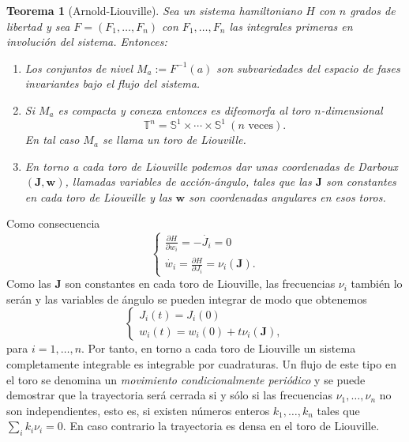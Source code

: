 \documentclass[12pt,a4paper,twoside]{article}
\newtheorem{thm}{Teorema}[section]
\theoremstyle{definition} \newtheorem{defn}[thm]{Definición}
\theoremstyle{definition} \newtheorem{ejemplo}[thm]{Ejemplo}
\theoremstyle{definition} \newtheorem{ejercicio}[thm]{Ejercicio}
\theoremstyle{remark} \newtheorem*{obs}{Observación}
\def\TT{\mathbb{T}}
\newcommand{\vect}[1]{\mathbf{#1}}
\begin{document}
  \begin{thm}[Arnold-Liouville]\label{arnoldliouville}
   Sea un sistema hamiltoniano $H$ con $n$ grados de libertad y sea $F=(F_1,\dots,F_n)$ con $F_1,\dots,F_n$ las integrales primeras en involución del sistema. Entonces:
   \begin{enumerate}
     \item Los conjuntos de nivel $M_a:=F^{-1}(a)$ son subvariedades del espacio de fases invariantes bajo el flujo del sistema.
     \item Si $M_a$ es compacta y conexa entonces es difeomorfa al toro $n$-dimensional
       \begin{equation*}
	 \TT^n=\mathbb{S} ^1 \times \cdots \times \mathbb{S}^1 \ (n \text{ veces}).
       \end{equation*}
       En tal caso $M_a$ se llama un \emph{toro de Liouville}.
     \item En torno a cada toro de Liouville podemos dar unas coordenadas de Darboux $(\vect{J},\vect{w})$, llamadas \emph{variables de acción-ángulo}, tales que las $\vect{J}$ son constantes en cada toro de Liouville y las $\vect{w}$ son coordenadas angulares en esos toros. 
   \end{enumerate}
  \end{thm}
  Como consecuencia
       \begin{equation}
	 \begin{cases}
	   \frac{\partial H}{\partial w_i}=-\dot{J_i}=0 \\
	   \dot{w_i}=\frac{\partial H}{\partial J_i}=\nu_i(\vect{J}). 
	 \end{cases}
       \end{equation}
       Como las $\vect{J}$ son constantes en cada toro de Liouville, las frecuencias $\nu_i$ también lo serán y las variables de ángulo se pueden integrar de modo que obtenemos
       \begin{equation}
	 \begin{cases}
	  J_i(t)=J_i(0) \\
	 w_i(t)=w_i(0)+t \nu_i(\vect{J}),
	 \end{cases}
       \end{equation}
       para $i=1,\dots,n$.
       Por tanto, en torno a cada toro de Liouville un sistema completamente integrable es integrable por cuadraturas. Un flujo de este tipo en el toro se denomina un \emph{movimiento condicionalmente periódico} y se puede demostrar \cite{arnold} que la trayectoria será cerrada si y sólo si las frecuencias $\nu_1,\dots,\nu_n$ no son independientes, esto es, si existen números enteros $k_1,\dots,k_n$ tales que $\sum_i k_i\nu_i=0$. En caso contrario la trayectoria es densa en el toro de Liouville.
\end{document}
